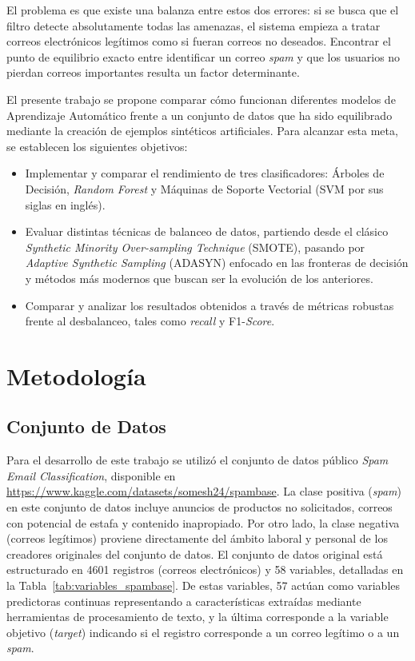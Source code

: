 \documentclass[a4paper,11pt ,openany]{book}
\begin{document}
El problema es que existe una balanza entre estos dos errores: si se busca que el filtro detecte absolutamente todas las amenazas, el sistema empieza a tratar correos electrónicos legítimos como si fueran correos no deseados. Encontrar el punto de equilibrio exacto entre identificar un correo \textit{spam} y que los usuarios no pierdan correos importantes resulta un factor determinante.

El presente trabajo se propone comparar cómo funcionan diferentes modelos de Aprendizaje Automático frente a un conjunto de datos que ha sido equilibrado mediante la creación de ejemplos sintéticos artificiales.
Para alcanzar esta meta, se establecen los siguientes objetivos:
\begin{itemize}
    \item Implementar y comparar el rendimiento de tres clasificadores: Árboles de Decisión, \textit{Random Forest} y Máquinas de Soporte Vectorial (SVM por sus siglas en inglés).
    \item Evaluar distintas técnicas de balanceo de datos, partiendo desde el clásico \textit{Synthetic Minority Over-sampling Technique} (SMOTE), pasando por \textit{Adaptive Synthetic Sampling} (ADASYN) enfocado en las fronteras de decisión y métodos más modernos que buscan ser la evolución de los anteriores.
    \item Comparar y analizar los resultados obtenidos a través de métricas robustas frente al desbalanceo, tales como \textit{recall} y F1-\textit{Score}.
\end{itemize}



\chapter{Metodología}
\label{ch:metodologia}

\section{Conjunto de Datos}
Para el desarrollo de este trabajo se utilizó el conjunto de datos público \textit{Spam Email Classification}, disponible en \url{https://www.kaggle.com/datasets/somesh24/spambase}. La clase positiva (\textit{spam}) en este conjunto de datos incluye anuncios de productos no solicitados, correos con potencial de estafa  y contenido inapropiado. Por otro lado, la clase negativa (correos legítimos) proviene directamente del ámbito laboral y personal de los creadores originales del conjunto de datos.
El conjunto de datos original está estructurado en 4601 registros (correos electrónicos) y 58 variables, detalladas en la Tabla~\ref{tab:variables_spambase}. De estas variables, 57 actúan como variables predictoras continuas representando a características extraídas mediante herramientas de procesamiento de texto, y la última corresponde a la variable objetivo (\textit{target}) indicando si el registro corresponde a un correo legítimo o a un \textit{spam}. 
\end{document}
